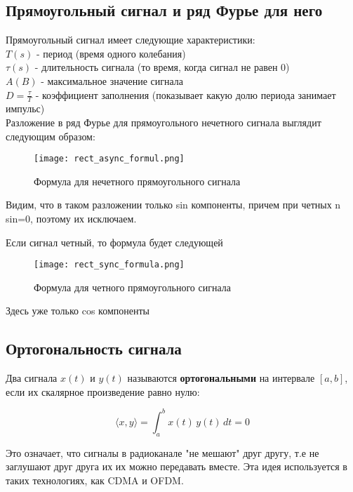 \subsection*{\textbf{Прямоугольный сигнал и ряд Фурье для него}}

Прямоугольный сигнал имеет следующие характеристики: \\

$T(s)$ - период (время одного колебания) \\
$\tau(s)$ - длительность сигнала (то время, когда сигнал не равен 0) \\
$A (B)$ - максимальное значение сигнала \\
$D = \frac{\tau}{T}$ - коэффициент заполнения (показывает какую долю периода занимает импульс) \\

Разложение в ряд Фурье для прямоугольного нечетного сигнала выглядит следующим образом:


\begin{figure}[H]
    \centering
    \texttt{[image: rect\_async\_formul.png]}
    \caption{Формула для нечетного прямоугольного сигнала}
\end{figure}

Видим, что в таком разложении только sin компоненты, причем при четных n sin=0, поэтому их исключаем.

Если сигнал четный, то формула будет следующей

\begin{figure}[H]
    \centering
    \texttt{[image: rect\_sync\_formula.png]}
    \caption{Формула для четного прямоугольного сигнала}
\end{figure}

Здесь уже только cos компоненты

\subsection*{\textbf{Ортогональность сигнала}}

Два сигнала \(x(t)\) и \(y(t)\) называются \textbf{ортогональными} на интервале \([a, b]\), если их скалярное произведение равно нулю:

\[
\langle x, y \rangle = \int_{a}^{b} x(t) \, y(t) \, dt = 0
\]

Это означает, что сигналы в радиоканале "не мешают" друг другу, т.е не заглушают друг друга их их можно передавать вместе. Эта идея используется в таких
технологиях, как CDMA и OFDM.
\endinput